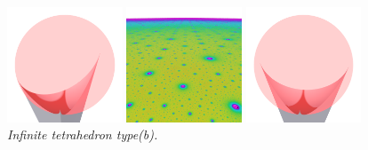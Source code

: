 \documentclass[suppldata, dvipdfmx]{interact}
\theoremstyle{plain}%
\theoremstyle{definition}
\theoremstyle{remark}
\theoremstyle{problemstyle}
\begin{document}
\begin{figure}[H]
 \begin{minipage}{0.5\textwidth}
  \begin{minipage}[t]{0.24\textwidth}
   \centering
   \includegraphics[width=1.35in, height=1.35in, keepaspectratio]{./img/sphairahedron/tetrahedron/sphairahedralPrism_b.png}
  \end{minipage}
  \hspace*{\fill}
  \begin{minipage}[t]{0.24\textwidth}
   \centering
   \includegraphics[width=1.35in, height=1.35in, keepaspectratio]{./img/sphairahedron/tetrahedron/limitset_b.png}
  \end{minipage}
  \hspace*{\fill}
  \caption{\textit{Infinite tetrahedron type(b).}}
  \label{fig:tetrahedronInf_b}
 \end{minipage}
 \hspace*{\fill}
 \begin{minipage}{0.5\textwidth}
  \begin{minipage}[t]{0.24\textwidth}
   \centering
   \includegraphics[width=1.35in, height=1.35in, keepaspectratio]{./img/sphairahedron/tetrahedron/sphairahedralPrism_c.png}
  \end{minipage}
  \hspace*{\fill}

\end{minipage}
\end{figure}
\end{document}
